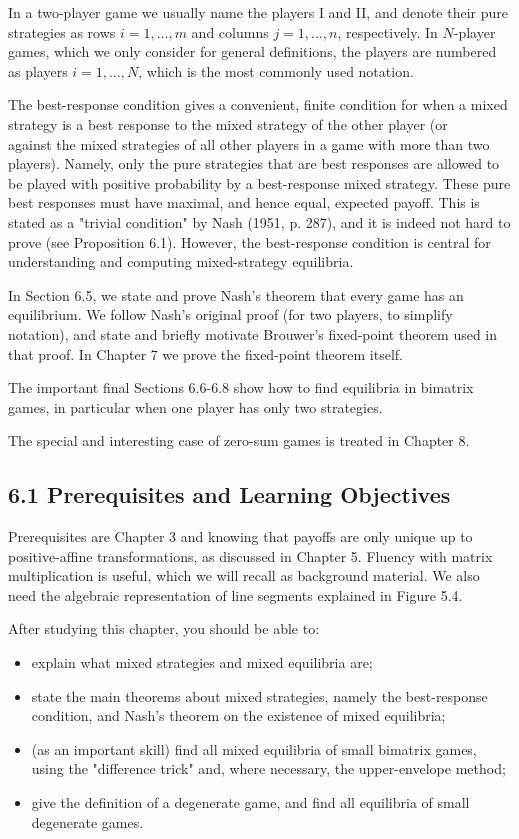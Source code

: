 \documentclass[12pt]{article}
\begin{document}
In a two-player game we usually name the players I and II, and denote their pure strategies as rows $i=1, \ldots, m$ and columns $j=1, \ldots, n$, respectively. In $N$-player games, which we only consider for general definitions, the players are numbered as players $i=1, \ldots, N$, which is the most commonly used notation.

The best-response condition gives a convenient, finite condition for when a mixed strategy is a best response to the mixed strategy of the other player (or\\
against the mixed strategies of all other players in a game with more than two players). Namely, only the pure strategies that are best responses are allowed to be played with positive probability by a best-response mixed strategy. These pure best responses must have maximal, and hence equal, expected payoff. This is stated as a "trivial condition" by Nash (1951, p. 287), and it is indeed not hard to prove (see Proposition 6.1). However, the best-response condition is central for understanding and computing mixed-strategy equilibria.

In Section 6.5, we state and prove Nash's theorem that every game has an equilibrium. We follow Nash's original proof (for two players, to simplify notation), and state and briefly motivate Brouwer's fixed-point theorem used in that proof. In Chapter 7 we prove the fixed-point theorem itself.

The important final Sections 6.6-6.8 show how to find equilibria in bimatrix games, in particular when one player has only two strategies.

The special and interesting case of zero-sum games is treated in Chapter 8.

\subsection*{6.1 Prerequisites and Learning Objectives}
Prerequisites are Chapter 3 and knowing that payoffs are only unique up to positive-affine transformations, as discussed in Chapter 5. Fluency with matrix multiplication is useful, which we will recall as background material. We also need the algebraic representation of line segments explained in Figure 5.4.

After studying this chapter, you should be able to:

\begin{itemize}
  \item explain what mixed strategies and mixed equilibria are;
  \item state the main theorems about mixed strategies, namely the best-response condition, and Nash's theorem on the existence of mixed equilibria;
  \item (as an important skill) find all mixed equilibria of small bimatrix games, using the "difference trick" and, where necessary, the upper-envelope method;
  \item give the definition of a degenerate game, and find all equilibria of small degenerate games.
\end{itemize}
\end{document}
